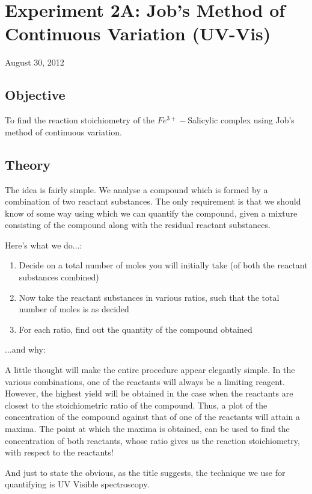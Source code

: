 \chapter{Experiment 2A: Job's Method of Continuous Variation (UV-Vis)}
\begin{flushright}
August 30, 2012
\end{flushright}

\section{Objective}
	To find the reaction stoichiometry of the $Fe^{3+}-$Salicylic complex using Job's method of continuous variation.

\section{Theory}
	The idea is fairly simple. We analyse a compound which is formed by a combination of two reactant substances. The only requirement is that we should know of some way using which we can quantify the compound, given a mixture consisting of the compound along with the residual reactant substances.
	\par
	Here's what we do...:
	\begin{enumerate}
		\item Decide on a total number of moles you will initially take (of both the reactant substances combined)
		\item Now take the reactant substances in various ratios, such that the total number of moles is as decided
		\item For each ratio, find out the quantity of the compound obtained
	\end{enumerate} 
	...and why:
	\par
	A little thought will make the entire procedure appear elegantly simple. In the various combinations, one of the reactants will always be a limiting reagent. However, the highest yield will be obtained in the case when the reactants are closest to the stoichiometric ratio of the compound. Thus, a plot of the concentration of the compound against that of one of the reactants will attain a maxima. The point at which the maxima is obtained, can be used to find the concentration of both reactants, whose ratio gives us the reaction stoichiometry, with respect to the reactants!
	\par
	And just to state the obvious, as the title suggests, the technique we use for quantifying is UV Visible spectroscopy.
